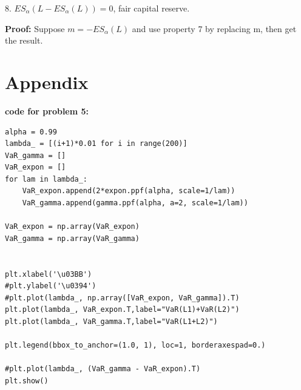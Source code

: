 \documentclass[letterpaper,11pt]{article}
\begin{document}
\begin{spacing}{1.2}
8. $ES_{\alpha}(L - ES_{\alpha}(L)) = 0$, fair capital reserve.

\textbf{Proof:} Suppose $m = - ES_{\alpha}(L)$ and use property 7 by replacing m, then get the result.

\section*{Appendix}
\textbf{code for problem 5:}
\begin{lstlisting}[title=code for problem 5, frame=shadowbox]
alpha = 0.99
lambda_ = [(i+1)*0.01 for i in range(200)]
VaR_gamma = []
VaR_expon = []
for lam in lambda_:
    VaR_expon.append(2*expon.ppf(alpha, scale=1/lam))
    VaR_gamma.append(gamma.ppf(alpha, a=2, scale=1/lam))

VaR_expon = np.array(VaR_expon)
VaR_gamma = np.array(VaR_gamma)


plt.xlabel('\u03BB')
#plt.ylabel('\u0394')
#plt.plot(lambda_, np.array([VaR_expon, VaR_gamma]).T)
plt.plot(lambda_, VaR_expon.T,label="VaR(L1)+VaR(L2)")
plt.plot(lambda_, VaR_gamma.T,label="VaR(L1+L2)")

plt.legend(bbox_to_anchor=(1.0, 1), loc=1, borderaxespad=0.)

#plt.plot(lambda_, (VaR_gamma - VaR_expon).T)
plt.show()
\end{lstlisting}

\end{spacing}
\end{document}
